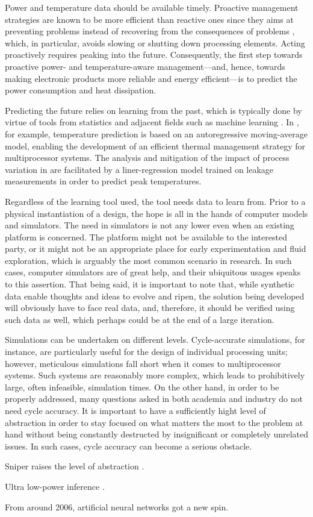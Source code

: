 Power and temperature data should be available timely. Proactive management
strategies are known to be more efficient than reactive ones since they aims at
preventing problems instead of recovering from the consequences of problems
\cite{coskun2008, chaudhry2015}, which, in particular, avoids slowing or
shutting down processing elements. Acting proactively requires peaking into the
future. Consequently, the first step towards proactive power- and
temperature-aware management---and, hence, towards making electronic products
more reliable and energy efficient---is to predict the power consumption and
heat dissipation.

Predicting the future relies on learning from the past, which is typically done
by virtue of tools from statistics and adjacent fields such as machine learning
\cite{bishop2006}. In \cite{coskun2008}, for example, temperature prediction is
based on an autoregressive moving-average model, enabling the development of an
efficient thermal management strategy for multiprocessor systems. The analysis
and mitigation of the impact of process variation in \cite{juan2014} are
facilitated by a liner-regression model trained on leakage measurements in order
to predict peak temperatures.

Regardless of the learning tool used, the tool needs data to learn from. Prior
to a physical instantiation of a design, the hope is all in the hands of
computer models and simulators. The need in simulators is not any lower even
when an existing platform is concerned. The platform might not be available to
the interested party, or it might not be an appropriate place for early
experimentation and fluid exploration, which is arguably the most common
scenario in research. In such cases, computer simulators are of great help, and
their ubiquitous usages speaks to this assertion. That being said, it is
important to note that, while synthetic data enable thoughts and ideas to evolve
and ripen, the solution being developed will obviously have to face real data,
and, therefore, it should be verified using such data as well, which perhaps
could be at the end of a large iteration.

Simulations can be undertaken on different levels. Cycle-accurate simulations,
for instance, are particularly useful for the design of individual processing
units; however, meticulous simulations fall short when it comes to
multiprocessor systems. Such systems are reasonably more complex, which leads to
prohibitively large, often infeasible, simulation times. On the other hand, in
order to be properly addressed, many questions asked in both academia and
industry do not need cycle accuracy. It is important to have a sufficiently
hight level of abstraction in order to stay focused on what matters the most to
the problem at hand without being constantly destructed by insignificant or
completely unrelated issues. In such cases, cycle accuracy can become a serious
obstacle.

Sniper raises the level of abstraction \cite{carlson2011}.

Ultra low-power inference \cite{park2015}.

From around 2006, artificial neural networks got a new spin.
